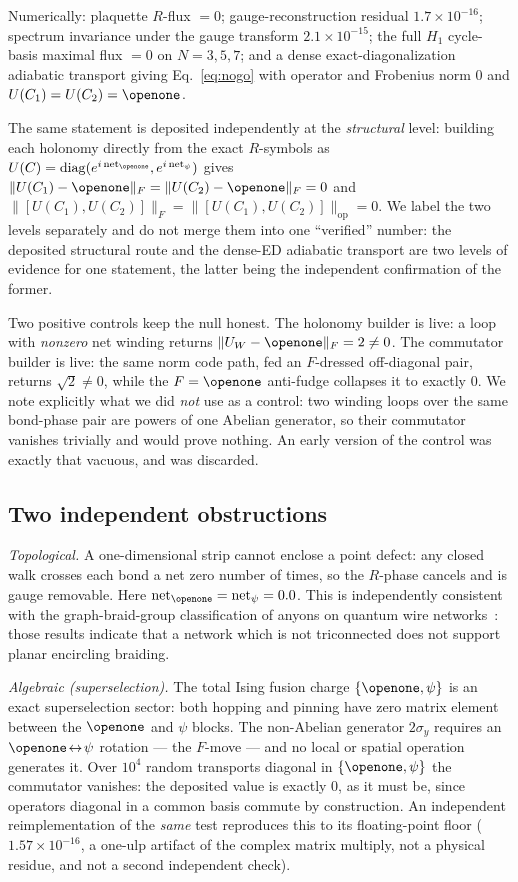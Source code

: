 \documentclass[aps,pra,twocolumn,superscriptaddress,longbibliography,floatfix,nofootinbib]{revtex4-2}
\newcommand{\Id}{\openone}
\newcommand{\Fnorm}[1]{\lVert #1 \rVert_{F}}
\newcommand{\Opnorm}[1]{\lVert #1 \rVert_{\mathrm{op}}}
\begin{document}
Numerically: plaquette $R$-flux $=0$; gauge-reconstruction residual
$1.7\times10^{-16}$; spectrum invariance under the gauge transform
$2.1\times10^{-15}$; the full $H_1$ cycle-basis maximal flux $=0$ on
$N=3,5,7$; and a dense exact-diagonalization adiabatic transport giving
Eq.~\eqref{eq:nogo} with operator and Frobenius norm $0$ and
$U(C_1)=U(C_2)=\Id$.

The same statement is deposited independently at the \emph{structural} level:
building each holonomy directly from the exact $R$-symbols as
$U(C)=\mathrm{diag}(e^{i\,\mathrm{net}_{\Id}},e^{i\,\mathrm{net}_{\psi}})$
gives $\Fnorm{U(C_1)-\Id} = \Fnorm{U(C_2)-\Id} = 0$ and
$\Fnorm{[U(C_1),U(C_2)]} = \Opnorm{[U(C_1),U(C_2)]} = 0$. We label the two
levels separately and do not merge them into one ``verified'' number: the
deposited structural route and the dense-ED adiabatic transport are two levels
of evidence for one statement, the latter being the independent confirmation of
the former.

Two positive controls keep the null honest. The holonomy builder is live: a
loop with \emph{nonzero} net winding returns $\Fnorm{U_W-\Id}=2\ne0$. The
commutator builder is live: the same norm code path, fed an $F$-dressed
off-diagonal pair, returns $\sqrt2\ne0$, while the $F=\Id$ anti-fudge collapses
it to exactly $0$. We note explicitly what we did \emph{not} use as a control:
two winding loops over the same bond-phase pair are powers of one Abelian
generator, so their commutator vanishes trivially and would prove nothing. An
early version of the control was exactly that vacuous, and was discarded.

\subsection{Two independent obstructions}
\label{sec:obstructions}

\emph{Topological.} A one-dimensional strip cannot enclose a point defect: any
closed walk crosses each bond a net zero number of times, so the $R$-phase
cancels and is gauge removable. Here
$\mathrm{net}_{\Id}=\mathrm{net}_{\psi}=0.0$. This is independently consistent
with the graph-braid-group classification of anyons on quantum wire
networks~\cite{ConlonSlingerland2022,Maciazek2023}: those results indicate that
a network which is not triconnected does not support planar encircling braiding.

\emph{Algebraic (superselection).} The total Ising fusion charge
$\{\Id,\psi\}$ is an exact superselection sector: both hopping and pinning have
zero matrix element between the $\Id$ and $\psi$ blocks. The non-Abelian
generator $2\sigma_y$ requires an $\Id\!\leftrightarrow\!\psi$ rotation --- the
$F$-move --- and no local or spatial operation generates it. Over $10^{4}$
random transports diagonal in $\{\Id,\psi\}$ the commutator vanishes: the
deposited value is exactly $0$, as it must be, since operators diagonal in a
common basis commute by construction. An independent reimplementation of the
\emph{same} test reproduces this to its floating-point floor
($1.57\times10^{-16}$, a one-ulp artifact of the complex matrix multiply, not a
physical residue, and not a second independent check).
\end{document}
